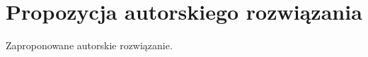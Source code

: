 \chapter{Propozycja autorskiego rozwiązania}
\label{cha:propozycjaAutorskiegoRozwiazania}

Zaproponowane autorskie rozwiązanie.


